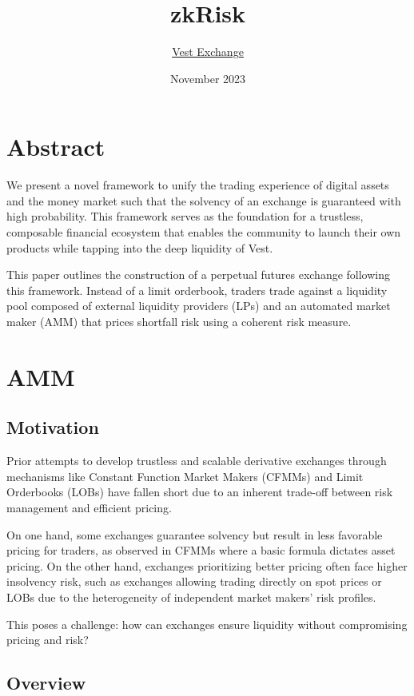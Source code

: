 \documentclass{article}
\title{\textbf{zkRisk}}
\author{\href{mailto:team@vest.xyz}{Vest Exchange}}
\date{November 2023}
\begin{document}
\maketitle

\tableofcontents

\section{Abstract}

We present a novel framework to unify the trading experience of digital assets and the money market such that the solvency of an exchange is guaranteed with high probability. This framework serves as the foundation for a trustless, composable financial ecosystem that enables the community to launch their own products while tapping into the deep liquidity of Vest. 

This paper outlines the construction of a perpetual futures exchange following this framework. Instead of a limit orderbook, traders trade against a liquidity pool composed of external liquidity providers (LPs) and an automated market maker (AMM) that prices shortfall risk using a coherent risk measure. 



\section{AMM}

\subsection{Motivation}

Prior attempts to develop trustless and scalable derivative exchanges through mechanisms like Constant Function Market Makers (CFMMs) and Limit Orderbooks (LOBs) have fallen short due to an inherent trade-off between risk management and efficient pricing.

On one hand, some exchanges guarantee solvency but result in less favorable pricing for traders, as observed in CFMMs where a basic formula dictates asset pricing. On the other hand, exchanges prioritizing better pricing often face higher insolvency risk, such as exchanges allowing trading directly on spot prices or LOBs due to the heterogeneity of independent market makers' risk profiles.

This poses a challenge: how can exchanges ensure liquidity without compromising pricing and risk?

\subsection{Overview}
\end{document}
